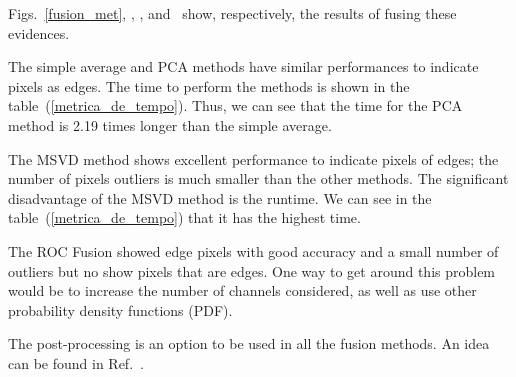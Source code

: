 \documentclass[conference]{IEEEtran}
\begin{document}
Figs.~\ref{fusion_met}, , , and~ show, respectively, the results of fusing these evidences. 

The simple average and PCA methods have similar performances to indicate pixels as edges. The time to perform the methods is shown in the table~(\ref{metrica_de_tempo}). Thus, we can see that the time for the PCA method is 2.19 times longer than the simple average.  

The MSVD method shows excellent performance to indicate pixels of edges; the number of pixels outliers is much smaller than the other methods. The significant disadvantage of the MSVD method is the runtime. We can see in the table~(\ref{metrica_de_tempo}) that it has the highest time.

The ROC Fusion showed edge pixels with good accuracy and a small number of outliers but no show pixels that are edges. One way to get around this problem would be to increase the number of channels considered, as well as use other probability density functions (PDF).

The post-processing is an option to be used in all the fusion methods. An idea can be found in Ref.~\cite{gmbf}. 
\end{document}
